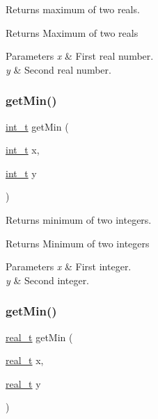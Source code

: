 Returns maximum of two reals. \begin{DoxyReturn}{Returns}
Maximum of two reals 
\end{DoxyReturn}

\begin{DoxyParams}{Parameters}
{\em x} & First real number. \\
\hline
{\em y} & Second real number. \\
\hline
\end{DoxyParams}
\mbox{\label{_utils_8ipp_a72072d0b9af880ab468c642bee9130a6}} 
\subsubsection{\texorpdfstring{get\+Min()}{getMin()}\hspace{0.1cm}{\footnotesize\ttfamily [1/2]}}
{\footnotesize\ttfamily \hyperlink{_types_8hpp_ab6fd6105e64ed14a0c9281326f05e623}{int\+\_\+t} get\+Min (\begin{DoxyParamCaption}\item[{\hyperlink{_types_8hpp_ab6fd6105e64ed14a0c9281326f05e623}{int\+\_\+t}}]{x,  }\item[{\hyperlink{_types_8hpp_ab6fd6105e64ed14a0c9281326f05e623}{int\+\_\+t}}]{y }\end{DoxyParamCaption})\hspace{0.3cm}{\ttfamily [inline]}}

Returns minimum of two integers. \begin{DoxyReturn}{Returns}
Minimum of two integers 
\end{DoxyReturn}

\begin{DoxyParams}{Parameters}
{\em x} & First integer. \\
\hline
{\em y} & Second integer. \\
\hline
\end{DoxyParams}
\mbox{\label{_utils_8ipp_aa083f5ed6e68f9cf54621ab4dc072fcf}} 
\subsubsection{\texorpdfstring{get\+Min()}{getMin()}\hspace{0.1cm}{\footnotesize\ttfamily [2/2]}}
{\footnotesize\ttfamily \hyperlink{qp_o_a_s_e_s__wrapper_8h_a0d00e2b3dfadee81331bbb39068570c4}{real\+\_\+t} get\+Min (\begin{DoxyParamCaption}\item[{\hyperlink{qp_o_a_s_e_s__wrapper_8h_a0d00e2b3dfadee81331bbb39068570c4}{real\+\_\+t}}]{x,  }\item[{\hyperlink{qp_o_a_s_e_s__wrapper_8h_a0d00e2b3dfadee81331bbb39068570c4}{real\+\_\+t}}]{y }\end{DoxyParamCaption})\hspace{0.3cm}{\ttfamily [inline]}}

